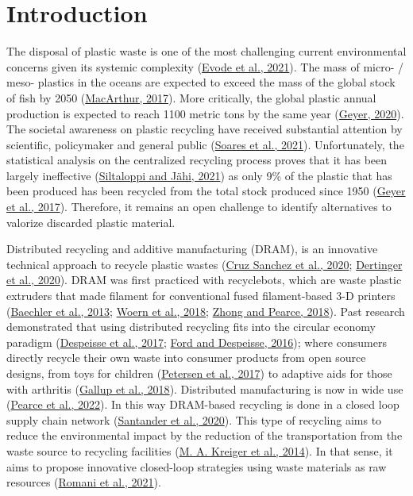 \documentclass[
  12pt,
  number,
  review]{elsarticle}
\begin{document}
\newpage

\hypertarget{introduction}{%
\section{Introduction}\label{introduction}}

The disposal of plastic waste is one of the most challenging current
environmental concerns given its systemic complexity
(\protect\hyperlink{ref-evode2021}{Evode et al., 2021}). The mass of
micro- / meso- plastics in the oceans are expected to exceed the mass of
the global stock of fish by 2050
(\protect\hyperlink{ref-macarthur2017}{MacArthur, 2017}). More
critically, the global plastic annual production is expected to reach
1100 metric tons by the same year
(\protect\hyperlink{ref-geyer2020}{Geyer, 2020}). The societal awareness
on plastic recycling have received substantial attention by scientific,
policymaker and general public
(\protect\hyperlink{ref-soares2021}{Soares et al., 2021}).
Unfortunately, the statistical analysis on the centralized recycling
process proves that it has been largely ineffective
(\protect\hyperlink{ref-Siltaloppi2021}{Siltaloppi and Jähi, 2021}) as
only 9\% of the plastic that has been produced has been recycled from
the total stock produced since 1950
(\protect\hyperlink{ref-Geyer2017}{Geyer et al., 2017}). Therefore, it
remains an open challenge to identify alternatives to valorize discarded
plastic material.

Distributed recycling and additive manufacturing (DRAM), is an
innovative technical approach to recycle plastic wastes
(\protect\hyperlink{ref-cruzsanchez2020}{Cruz Sanchez et al., 2020};
\protect\hyperlink{ref-dertinger2020}{Dertinger et al., 2020}). DRAM was
first practiced with recyclebots, which are waste plastic extruders that
made filament for conventional fused filament-based 3-D printers
(\protect\hyperlink{ref-baechler2013}{Baechler et al., 2013};
\protect\hyperlink{ref-woern2018}{Woern et al., 2018};
\protect\hyperlink{ref-zhong2018}{Zhong and Pearce, 2018}). Past
research demonstrated that using distributed recycling fits into the
circular economy paradigm
(\protect\hyperlink{ref-Despeisse2016}{Despeisse et al., 2017};
\protect\hyperlink{ref-Ford2016}{Ford and Despeisse, 2016}); where
consumers directly recycle their own waste into consumer products from
open source designs, from toys for children
(\protect\hyperlink{ref-Petersen2017}{Petersen et al., 2017}) to
adaptive aids for those with arthritis
(\protect\hyperlink{ref-gallup2018}{Gallup et al., 2018}). Distributed
manufacturing is now in wide use
(\protect\hyperlink{ref-pearce2022}{Pearce et al., 2022}). In this way
DRAM-based recycling is done in a closed loop supply chain network
(\protect\hyperlink{ref-santander2020}{Santander et al., 2020}). This
type of recycling aims to reduce the environmental impact by the
reduction of the transportation from the waste source to recycling
facilities (\protect\hyperlink{ref-kreiger2014}{M. A. Kreiger et al.,
2014}). In that sense, it aims to propose innovative closed-loop
strategies using waste materials as raw resources
(\protect\hyperlink{ref-romani2021}{Romani et al., 2021}).
\end{document}
